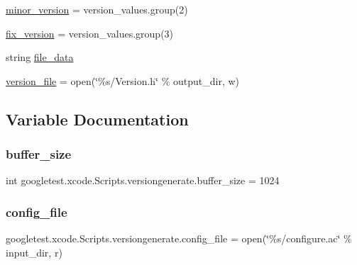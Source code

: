 \begin{DoxyCompactItemize}
\item 
\mbox{\hyperlink{namespacegoogletest_1_1xcode_1_1_scripts_1_1versiongenerate_ae0096f88d858abd95bcc24af5b565512}{minor\+\_\+version}} = version\+\_\+values.\+group(2)
\item 
\mbox{\hyperlink{namespacegoogletest_1_1xcode_1_1_scripts_1_1versiongenerate_a6eac23b91d1ceace3963a751e68700d5}{fix\+\_\+version}} = version\+\_\+values.\+group(3)
\item 
string \mbox{\hyperlink{namespacegoogletest_1_1xcode_1_1_scripts_1_1versiongenerate_a15f442dc24035c601554b4029661b20e}{file\+\_\+data}}
\item 
\mbox{\hyperlink{namespacegoogletest_1_1xcode_1_1_scripts_1_1versiongenerate_a3f21ed2a20fc06ee762699370d9fc87f}{version\+\_\+file}} = open(\char`\"{}\%s/Version.\+h\char`\"{} \% output\+\_\+dir, \textquotesingle{}w\textquotesingle{})
\end{DoxyCompactItemize}


\subsection{Variable Documentation}
\mbox{\label{namespacegoogletest_1_1xcode_1_1_scripts_1_1versiongenerate_a940807ec879f248f6ae06617bd4e24ac}} 
\subsubsection{\texorpdfstring{buffer\_size}{buffer\_size}}
{\footnotesize\ttfamily int googletest.\+xcode.\+Scripts.\+versiongenerate.\+buffer\+\_\+size = 1024}

\mbox{\label{namespacegoogletest_1_1xcode_1_1_scripts_1_1versiongenerate_ac4026359183baf7e80f13e280faf2e21}} 
\subsubsection{\texorpdfstring{config\_file}{config\_file}}
{\footnotesize\ttfamily googletest.\+xcode.\+Scripts.\+versiongenerate.\+config\+\_\+file = open(\char`\"{}\%s/configure.\+ac\char`\"{} \% input\+\_\+dir, \textquotesingle{}r\textquotesingle{})}

